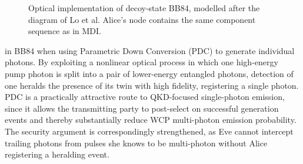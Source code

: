 \documentclass[9pt,technote]{IEEEtran}
\begin{document}
\begin{figure}[h]
\begin{subfigure}
        \caption{Optical implementation of decoy-state BB84, modelled after the diagram of Lo et al. Alice's node contains the same component sequence as in MDI.}
        \label{fig:optical_bb84}
    \end{subfigure}
\end{figure}
\noindent in BB84 when using Parametric Down Conversion (PDC) to generate individual photons. By exploiting a nonlinear optical process in which one high-energy pump photon is split into a pair of lower-energy entangled photons, detection of one heralds the presence of its twin with high fidelity, registering a single photon. PDC is a practically attractive route to QKD-focused single-photon emission, since it allows the transmitting party to post-select on successful generation events and thereby substantially reduce WCP multi-photon emission probability. The security argument is correspondingly strengthened, as Eve cannot intercept trailing photons from pulses she knows to be multi-photon without Alice registering a heralding event.
\end{document}
